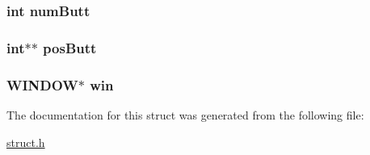 \subsubsection[{\texorpdfstring{num\+Butt}{numButt}}]{\setlength{\rightskip}{0pt plus 5cm}int num\+Butt}\hypertarget{struct___win_a1910eef8db510628192f27b24cdd0eb2}{}\label{struct___win_a1910eef8db510628192f27b24cdd0eb2}
\subsubsection[{\texorpdfstring{pos\+Butt}{posButt}}]{\setlength{\rightskip}{0pt plus 5cm}int$\ast$$\ast$ pos\+Butt}\hypertarget{struct___win_a6d6060115df541c075d8f529a1511d26}{}\label{struct___win_a6d6060115df541c075d8f529a1511d26}
\subsubsection[{\texorpdfstring{win}{win}}]{\setlength{\rightskip}{0pt plus 5cm}W\+I\+N\+D\+OW$\ast$ win}\hypertarget{struct___win_a09d962b38c0d24e36078d717d2a6ed96}{}\label{struct___win_a09d962b38c0d24e36078d717d2a6ed96}


The documentation for this struct was generated from the following file\+:\begin{DoxyCompactItemize}
\item 
\hyperlink{struct_8h}{struct.\+h}\end{DoxyCompactItemize}

